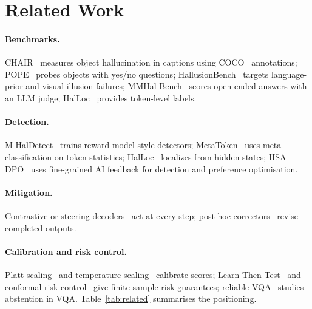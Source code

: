 \documentclass[11pt]{article}
\begin{document}
\section{Related Work}
\label{sec:related}
\paragraph{Benchmarks.} CHAIR~\cite{rohrbach2018chair} measures object hallucination in captions using COCO~\cite{lin2014coco} annotations; POPE~\cite{li2023pope} probes objects with yes/no questions; HallusionBench~\cite{guan2024hallusionbench} targets language-prior and visual-illusion failures; MMHal-Bench~\cite{sun2024llavarlhf} scores open-ended answers with an LLM judge; HalLoc~\cite{park2025halloc} provides token-level labels.
\paragraph{Detection.} M-HalDetect~\cite{gunjal2024mhaldetect} trains reward-model-style detectors; MetaToken~\cite{fieback2024metatoken} uses meta-classification on token statistics; HalLoc~\cite{park2025halloc} localizes from hidden states; HSA-DPO~\cite{xiao2025hsadpo} uses fine-grained AI feedback for detection and preference optimisation.
\paragraph{Mitigation.} Contrastive or steering decoders~\cite{leng2024vcd,huang2024opera,chen2024halc,li2025vista,fieback2025ecd} act at every step; post-hoc correctors~\cite{yin2024woodpecker,zhou2024lure,wu2024logiccheckgpt} revise completed outputs.
\paragraph{Calibration and risk control.} Platt scaling~\cite{platt1999probabilistic} and temperature scaling~\cite{guo2017calibration} calibrate scores; Learn-Then-Test~\cite{angelopoulos2025ltt} and conformal risk control~\cite{angelopoulos2022crc} give finite-sample risk guarantees; reliable VQA~\cite{whitehead2022reliable} studies abstention in VQA.
Table~\ref{tab:related} summarises the positioning.



\end{document}
